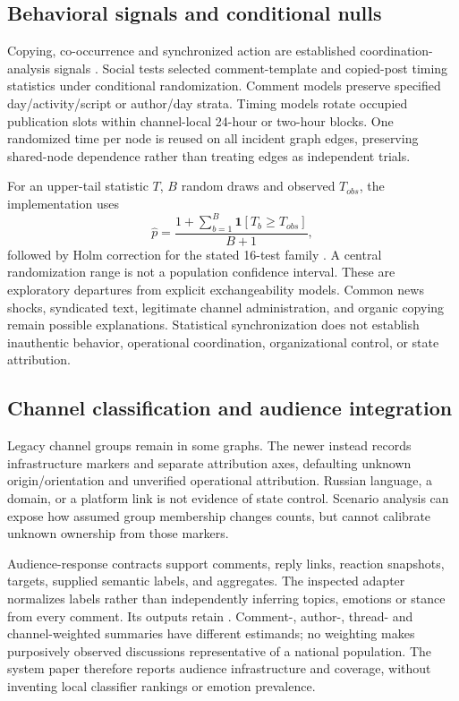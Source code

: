 \subsection{Behavioral signals and conditional nulls}
Copying, co-occurrence and synchronized action are established coordination-analysis signals \citep{Pacheco2021,Nizzoli2021,Magelinski2022}. Social tests selected comment-template and copied-post timing statistics under conditional randomization. Comment models preserve specified day/activity/script or author/day strata. Timing models rotate occupied publication slots within channel-local 24-hour or two-hour blocks. One randomized time per node is reused on all incident graph edges, preserving shared-node dependence rather than treating edges as independent trials.

For an upper-tail statistic $T$, $B$ random draws and observed $T_{obs}$, the implementation uses
\begin{equation}\label{eq:permutation}
\widehat p=\frac{1+\sum_{b=1}^{B}\mathbf{1}[T_b\geq T_{obs}]}{B+1},
\end{equation}
followed by Holm correction for the stated 16-test family \citep{Phipson2010,Holm1979}. A central randomization range is not a population confidence interval. These are exploratory departures from explicit exchangeability models. Common news shocks, syndicated text, legitimate channel administration, and organic copying remain possible explanations. Statistical synchronization does not establish inauthentic behavior, operational coordination, organizational control, or state attribution.

\subsection{Channel classification and audience integration}
Legacy channel groups remain in some graphs. The newer  instead records infrastructure markers and separate attribution axes, defaulting unknown origin/orientation and unverified operational attribution. Russian language, a domain, or a platform link is not evidence of state control. Scenario analysis can expose how assumed group membership changes counts, but cannot calibrate unknown ownership from those markers.

Audience-response contracts support comments, reply links, reaction snapshots, targets, supplied semantic labels, and aggregates. The inspected adapter normalizes labels rather than independently inferring topics, emotions or stance from every comment. Its outputs retain . Comment-, author-, thread- and channel-weighted summaries have different estimands; no weighting makes purposively observed discussions representative of a national population. The system paper therefore reports audience infrastructure and coverage, without inventing local classifier rankings or emotion prevalence.

